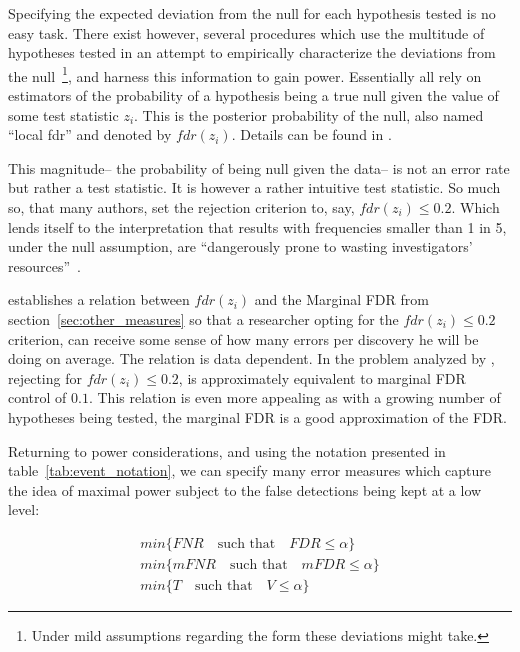 \documentclass[review,12pt]{article}
\begin{document}
Specifying the expected deviation from the null for each hypothesis tested is no easy task. There exist however, several procedures which use the multitude of hypotheses tested in an attempt to empirically characterize the deviations from the null~\footnote{ Under mild assumptions regarding the form these deviations might take.}, and harness this information to gain power. Essentially all rely on estimators of the probability of a hypothesis being a true null given the value of some test statistic $z_i$. This is the posterior probability of the null, also named ``local fdr'' and denoted by $fdr(z_i)$. Details can be found in \cite{efron_microarrays_2008}. 

This magnitude-- the probability of being null given the data-- is not an error rate but rather a test statistic. It is however a rather intuitive test statistic. So much so, that many authors, set the rejection criterion to, say, $fdr(z_i)\leq 0.2$. Which lends itself to the interpretation that results with frequencies smaller than 1 in 5, under the null assumption, are ``dangerously prone to wasting investigators' resources''~\cite{efron_microarrays_2008}. 

\citet{storey_positive_2003} establishes a relation between $fdr(z_i)$ and the Marginal FDR from section~\ref{sec:other_measures} so that a researcher opting for the $fdr(z_i)\leq 0.2$ criterion, can receive some sense of how many errors per discovery he will be doing on average.  The relation is data dependent. In the problem analyzed by \citet{efron_microarrays_2008}, rejecting for $fdr(z_i)\leq 0.2$, is approximately equivalent to marginal FDR control of $0.1$.
This relation is even more appealing as with a growing number of hypotheses being tested, the marginal FDR is a good approximation of the FDR. 

Returning to power considerations, and using the notation presented in table~\ref{tab:event_notation}, we can specify many error measures which capture the idea of maximal power subject to the false detections being kept at a low level:

\begin{align}
        min\{FNR \quad \text{such that} \quad FDR\leq \alpha \} \label{eq:compound_1}\\
	min\{mFNR \quad \text{such that} \quad mFDR\leq \alpha \} \label{eq:compound_2}\\
	min\{T \quad \text{such that} \quad V \leq \alpha \} \label{eq:compound_3}
\end{align}
\end{document}
